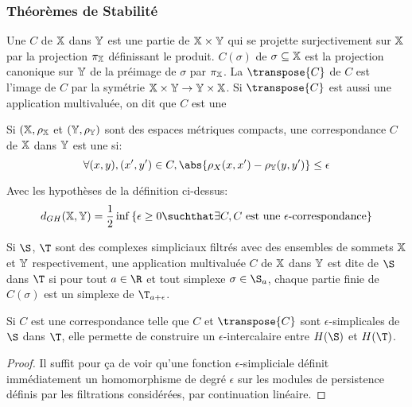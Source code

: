 \subsubsection{Théorèmes de Stabilité}
\begin{definition}
	Une  $C$ de $\mathbb{X}$ dans $\mathbb{Y}$ est une partie de $\mathbb{X} \times \mathbb{Y}$ qui se projette surjectivement sur $\mathbb{X}$ par la projection $\pi_{\mathbb{X}}$ définissant le produit.
	 $C(\sigma)$ de $\sigma \subseteq \mathbb{X}$ est la projection canonique sur $\mathbb{Y}$ de la préimage de $\sigma$ par $\pi_{\mathbb{X}}$.
	La  $\transpose{C}$ de $C$ est l'image de $C$ par la symétrie $\mathbb{X} \times \mathbb{Y} \to \mathbb{Y} \times \mathbb{X}$.
	Si $\transpose{C}$ est aussi une application multivaluée, on dit que $C$ est une 
\end{definition}

\begin{definition}
	Si $(\mathbb{X}, \rho_{\mathbb{X}}$ et $(\mathbb{Y}, \rho_{\mathbb{Y}})$ sont des espaces métriques compacts, une correspondance $C$ de $\mathbb{X}$ dans $\mathbb{Y}$ est une  si:
	\begin{equation*}
		\forall (x, y), (x', y') \in C, \abs{\rho_{X}(x, x') - \rho_{\Y}(y, y')} \leq \epsilon
	\end{equation*}
\end{definition}

\begin{proposition}
	Avec les hypothèses de la définition ci-dessus:
	\begin{equation*}
		d_{GH}(\X, \Y) = \frac{1}{2}\inf \left\{\epsilon \geq 0\suchthat \exists C, C \text{ est une $\epsilon$-correspondance}\right\}
	\end{equation*}
\end{proposition}

\begin{definition}
	Si $\S$, $\T$ sont des complexes simpliciaux filtrés avec des ensembles de sommets $\mathbb{X}$ et $\mathbb{Y}$ respectivement, une application multivaluée $C$ de $\mathbb{X}$ dans $\mathbb{Y}$ est dite 
	de $\S$ dans $\T$ si pour tout $a \in \R$ et tout simplexe $\sigma \in \S_{a}$, chaque partie finie de $C(\sigma)$ est un simplexe de $\T_{a + \epsilon}$.
\end{definition}

\begin{proposition}\label{prop:intercalaire-correspondance}
	Si $C$ est une correspondance telle que $C$ et $\transpose{C}$ sont $\epsilon$-simplicales de $\S$ dans $\T$, elle permette de construire un $\epsilon$-intercalaire entre $H(\S)$ et $H(\T)$.
\end{proposition}
\begin{proof}
	Il suffit pour ça de voir qu'une fonction $\epsilon$-simpliciale définit immédiatement un homomorphisme de degré $\epsilon$ sur les modules de persistence définis par les filtrations considérées, par continuation linéaire.
\end{proof}

